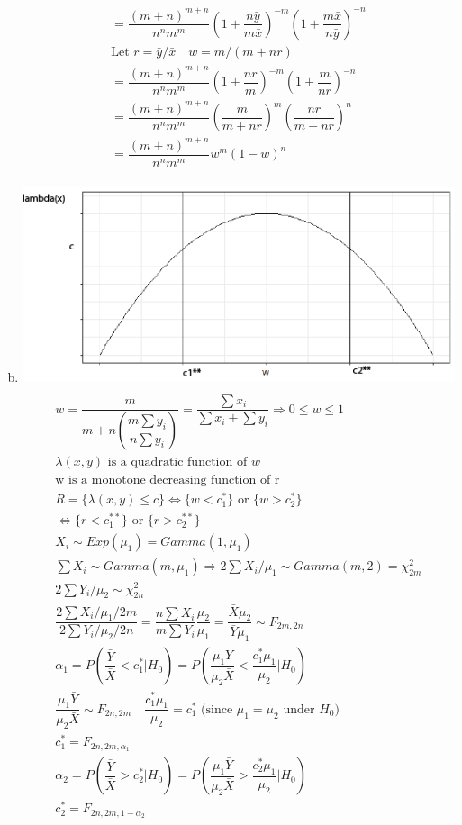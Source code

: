 \documentclass{article}
\newcommand{\lm}{\lambda}
\newcommand{\lra}{\Leftrightarrow}
\newcommand{\al}{\alpha}
\newcommand{\Bx}{\bar{X}}
\newcommand{\By}{\bar{Y}}
\begin{document}
\begin{flushleft}
\begin{enumerate}[(a)]
\begin{multline*}
=\dfrac{(m+n)^{m+n}}{n^n m^m}\left(1+\dfrac{n\bar{y}}{m\bar{x}}\right)^{-m}\left(1+\dfrac{m\bar{x}}{
n\bar{y}}\right)^{-n}\\
\text{Let } r=\bar{y}/\bar{x} \quad w=m/(m+nr)\\
=\dfrac{(m+n)^{m+n}}{n^n m^m}\left(1+\dfrac{nr}{m}\right)^{-m}\left(1+\dfrac{m}{nr}\right)^{-n}\\
=\dfrac{(m+n)^{m+n}}{n^n m^m}\left(\dfrac{m}{m+nr}\right)^m\left(\dfrac{nr}{m+nr}\right)^n\\
=\dfrac{(m+n)^{m+n}}{n^n m^m}w^m(1-w)^n\\
\end{multline*}

	\item 
\includegraphics[scale=.8]{rcode/wplot.png}\\
\begin{multline*}\\
w=\dfrac{m}{m+n\left(\dfrac{m\sum y_i}{n\sum y_i}\right)}=\dfrac{\sum x_i}{\sum x_i+\sum y_i} \Rightarrow 0\leq w\leq 1\\
\lm(x,y) \text{ is a quadratic function of } w\\
\text{w is a monotone decreasing function of r}\\
R=\{\lm(x,y)\leq c \} \lra \{w<c_1^* \} \text{ or } \{w>c_2^*\}\\
\lra \{r<c_1^{**}\} \text{ or } \{r>c_2^{**}\}\\
X_i\sim Exp(\mu_1)=Gamma(1,\mu_1)\\
\sum X_i\sim Gamma(m,\mu_1) \Rightarrow 2\sum X_i/\mu_1 \sim Gamma(m,2)=\chi^2_{2m}\\
2\sum Y_i/\mu_2\sim \chi^2_{2n}\\
\dfrac{2\sum X_i/\mu_1/2m}{2\sum Y_i/\mu_2/2n}=\dfrac{n\sum X_i}{m\sum Y_i}\dfrac{\mu_2}{\mu_1}=\dfrac{\Bx \mu_2}{\By \mu_1}\sim F_{2m,2n}\\
\al_1=P(\dfrac{\By}{\Bx}<c_1^*|H_0)=P(\dfrac{\mu_1\By}{\mu_2\Bx}<\dfrac{c_1^*\mu_1}{\mu_2}|H_0)\\
\dfrac{\mu_1\By}{\mu_2\Bx}\sim F_{2n,2m} \quad \dfrac{c_1^*\mu_1}{\mu_2}=c_1^* \text{ (since  } \mu_1=\mu_2 \text{ under } H_0)\\
c_1^*=F_{2n,2m,\al_1}\\
\al_2=P(\dfrac{\By}{\Bx}>c_2^*|H_0)=P(\dfrac{\mu_1\By}{\mu_2\Bx}>\dfrac{c_2^*\mu_1}{\mu_2}|H_0)\\
c_2^*=F_{2n,2m,1-\al_2}\\
\end{multline*}


\end{enumerate}
\end{flushleft}
\end{document}
